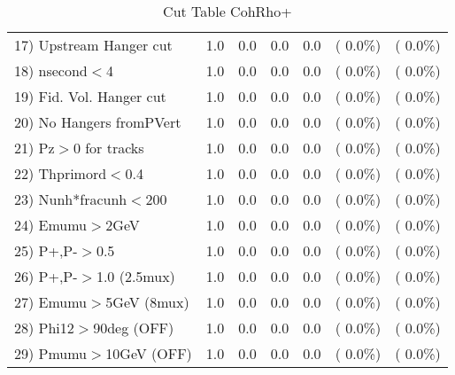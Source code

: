 \begin{table}[h!]
\begin{tabular}{||l||r|r|r|r|r|r||}
 17) Upstream Hanger cut  &          1.0 &          0.0 &          0.0 &          0.0 & (  0.0\%) & (  0.0\%) \\
 18) nsecond$<$4          &          1.0 &          0.0 &          0.0 &          0.0 & (  0.0\%) & (  0.0\%) \\
 19) Fid. Vol. Hanger cut &          1.0 &          0.0 &          0.0 &          0.0 & (  0.0\%) & (  0.0\%) \\
 20) No Hangers fromPVert &          1.0 &          0.0 &          0.0 &          0.0 & (  0.0\%) & (  0.0\%) \\
 21) Pz$>$0 for tracks    &          1.0 &          0.0 &          0.0 &          0.0 & (  0.0\%) & (  0.0\%) \\
 22) Thprimord$<$0.4      &          1.0 &          0.0 &          0.0 &          0.0 & (  0.0\%) & (  0.0\%) \\
 23) Nunh*fracunh$<$200   &          1.0 &          0.0 &          0.0 &          0.0 & (  0.0\%) & (  0.0\%) \\
 24) Emumu$>$2GeV         &          1.0 &          0.0 &          0.0 &          0.0 & (  0.0\%) & (  0.0\%) \\
 25) P+,P-$>$0.5          &          1.0 &          0.0 &          0.0 &          0.0 & (  0.0\%) & (  0.0\%) \\
 26) P+,P-$>$1.0 (2.5mux) &          1.0 &          0.0 &          0.0 &          0.0 & (  0.0\%) & (  0.0\%) \\
 27) Emumu$>$5GeV  (8mux) &          1.0 &          0.0 &          0.0 &          0.0 & (  0.0\%) & (  0.0\%) \\
 28) Phi12$>$90deg  (OFF) &          1.0 &          0.0 &          0.0 &          0.0 & (  0.0\%) & (  0.0\%) \\
 29) Pmumu$>$10GeV  (OFF) &          1.0 &          0.0 &          0.0 &          0.0 & (  0.0\%) & (  0.0\%) \\
 \hline
 \hline
 \end{tabular}
 \caption{Cut Table  CohRho+  }
 \label{tab-cutcohjpsi-mumu_anumunc}
 \end{table}
